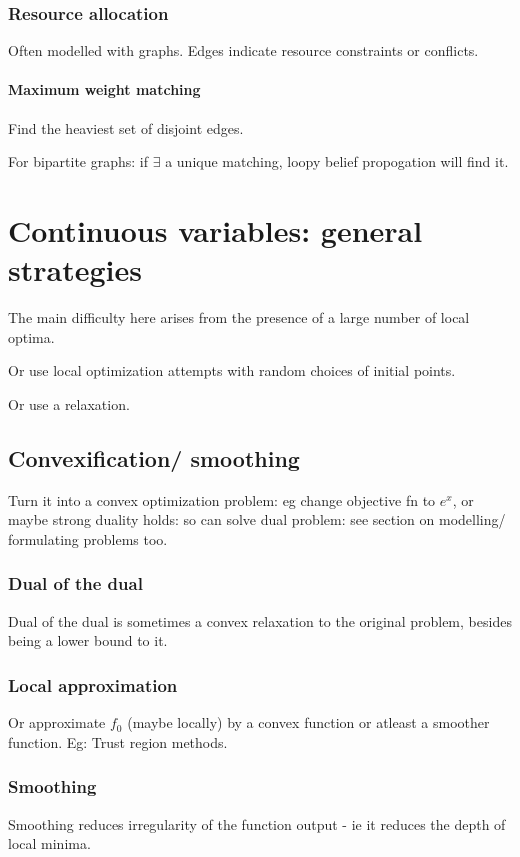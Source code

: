 \documentclass[oneside, article]{memoir}
\begin{document}
\subsection{Resource allocation}
Often modelled with graphs. Edges indicate resource constraints or conflicts.

\subsubsection{Maximum weight matching}
Find the heaviest set of disjoint edges.

For bipartite graphs: if $\exists$ a unique matching, loopy belief propogation will find it.

\chapter{Continuous variables: general strategies}
The main difficulty here arises from the presence of a large number of local optima.

Or use local optimization attempts with random choices of initial points.

Or use a relaxation. 

\section{Convexification/ smoothing}
Turn it into a convex optimization problem: eg change objective fn to $e^{x}$, or maybe strong duality holds: so can solve dual problem: see section on modelling/ formulating problems too.

\subsection{Dual of the dual}
Dual of the dual is sometimes a convex relaxation to the original problem, besides being a lower bound to it.

\subsection{Local approximation}
Or approximate $f_0$ (maybe locally) by a convex function or atleast a smoother function. Eg: Trust region methods.

\subsection{Smoothing}
Smoothing reduces irregularity of the function output - ie it reduces the depth of local minima.
\end{document}
